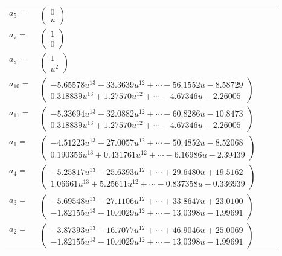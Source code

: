 \documentclass[1p]{elsarticle_modified}
\theoremstyle{definition}
\begin{document}
\begin{tabular}{m{7pt} m{180pt} m{7pt} m{180pt} }
\flushright $a_{5}=$&$\begin{pmatrix}0\\u\end{pmatrix}$ \\
\flushright $a_{7}=$&$\begin{pmatrix}1\\0\end{pmatrix}$ \\
\flushright $a_{8}=$&$\begin{pmatrix}1\\u^2\end{pmatrix}$ \\
\flushright $a_{10}=$&$\begin{pmatrix}-5.65578 u^{13}-33.3639 u^{12}+\cdots-56.1552 u-8.58729\\0.318839 u^{13}+1.27570 u^{12}+\cdots-4.67346 u-2.26005\end{pmatrix}$ \\
\flushright $a_{11}=$&$\begin{pmatrix}-5.33694 u^{13}-32.0882 u^{12}+\cdots-60.8286 u-10.8473\\0.318839 u^{13}+1.27570 u^{12}+\cdots-4.67346 u-2.26005\end{pmatrix}$ \\
\flushright $a_{1}=$&$\begin{pmatrix}-4.51223 u^{13}-27.0057 u^{12}+\cdots-50.4852 u-8.52068\\0.190356 u^{13}+0.431761 u^{12}+\cdots-6.16986 u-2.39439\end{pmatrix}$ \\
\flushright $a_{4}=$&$\begin{pmatrix}-5.25817 u^{13}-25.6393 u^{12}+\cdots+29.6480 u+19.5162\\1.06661 u^{13}+5.25611 u^{12}+\cdots-0.837358 u-0.336939\end{pmatrix}$ \\
\flushright $a_{3}=$&$\begin{pmatrix}-5.69548 u^{13}-27.1106 u^{12}+\cdots+33.8647 u+23.0100\\-1.82155 u^{13}-10.4029 u^{12}+\cdots-13.0398 u-1.99691\end{pmatrix}$ \\
\flushright $a_{2}=$&$\begin{pmatrix}-3.87393 u^{13}-16.7077 u^{12}+\cdots+46.9046 u+25.0069\\-1.82155 u^{13}-10.4029 u^{12}+\cdots-13.0398 u-1.99691\end{pmatrix}$ \\

\end{tabular}
\end{document}
